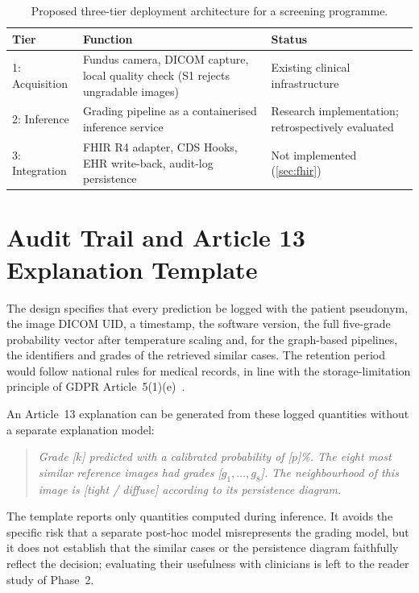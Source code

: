 \begin{table}[H]
\centering
\caption[Three-tier deployment architecture (proposed)]{Proposed three-tier deployment architecture for a screening programme.}
\label{tab:tiers}
\small
\begin{tabular}{@{}l P{7.4cm} P{4.4cm}@{}}
\toprule
Tier & Function & Status \\
: Acquisition & Fundus camera, DICOM capture, local quality check (S1 rejects ungradable images) & Existing clinical infrastructure \\
2: Inference & Grading pipeline as a containerised inference service & Research implementation; retrospectively evaluated \\
3: Integration & FHIR R4 adapter, CDS Hooks, EHR write-back, audit-log persistence & Not implemented (\cref{sec:fhir}) \\
\bottomrule
\end{tabular}
\end{table}

\section{Audit Trail and Article 13 Explanation Template}
\label{sec:audit}

The design specifies that every prediction be logged with the patient pseudonym, the
image DICOM UID, a timestamp, the software version, the full five-grade probability vector
after temperature scaling and, for the graph-based pipelines, the identifiers and grades of
the retrieved similar cases. The retention period would follow national rules for medical
records, in line with the storage-limitation principle of GDPR Article~5(1)(e)~\cite{gdpr2016}.

An Article~13 explanation can be generated from these logged quantities without a
separate explanation model:

\begin{quote}\small\itshape
Grade [$k$] predicted with a calibrated probability of [$p$]\%. The eight most similar
reference images had grades [$g_1,\ldots,g_8$]. The neighbourhood of this image is
[tight / diffuse] according to its persistence diagram.
\end{quote}

The template reports only quantities computed during inference. It avoids the specific
risk that a separate post-hoc model misrepresents the grading model, but it does not
establish that the similar cases or the persistence diagram faithfully reflect the
decision; evaluating their usefulness with clinicians is left to the reader study of
Phase~2.


